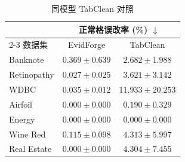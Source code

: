 \begin{table}[tb]
\centering
\caption{同模型 TabClean 对照}
\label{tab:tabclean-new}
\fontsize{8}{9.6}\selectfont
\setlength{\tabcolsep}{3pt}
\renewcommand{\arraystretch}{1.10}
\begin{tabular*}{\columnwidth}{@{\extracolsep{\fill}}lcc@{}}
\toprule
 & \multicolumn{2}{c}{正常格误改率 (\%) $\downarrow$} \\
\cmidrule(lr){2-3}
数据集 & EvidForge & TabClean \\
\midrule
Banknote & $0.369\pm0.639$ & $2.682\pm1.988$ \\
Retinopathy & $0.027\pm0.025$ & $3.621\pm3.142$ \\
WDBC & $0.035\pm0.012$ & $11.933\pm20.253$ \\
Airfoil & $0.000\pm0.000$ & $0.190\pm0.329$ \\
Energy & $0.000\pm0.000$ & $0.000\pm0.000$ \\
Wine Red & $0.115\pm0.098$ & $4.313\pm5.997$ \\
Real Estate & $0.000\pm0.000$ & $4.304\pm7.455$ \\
\bottomrule
\end{tabular*}
\end{table}
